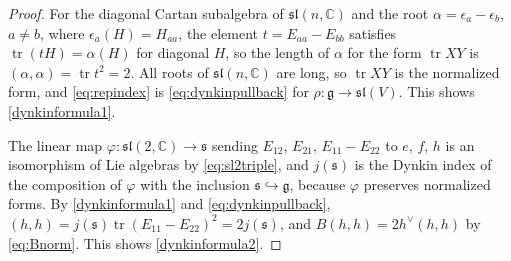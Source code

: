\documentclass [leqno, 10pt]{amsart}
\theoremstyle{definition}
\numberwithin{equation}{section}
\newcommand{\ep}{\epsilon}
\newcommand{\al}{\alpha}
\newcommand{\sll}{\mathfrak{sl}}
\newcommand{\g}{\mathfrak{g}}
\newcommand{\com}{\mathbb C}
\newcommand{\tr}{\operatorname{tr}}
\newcommand{\hv}{h^\vee}
\newcommand{\subs}{\mathfrak{s}}
\begin{document}
\begin{proof}
For the diagonal Cartan subalgebra of $\sll(n, \com)$ and the root $\al = \ep_{a} - \ep_{b}$, $a \neq b$, where $\ep_{a}(H) = H_{aa}$, the element $t = E_{aa} - E_{bb}$ satisfies $\tr(tH) = \al(H)$ for diagonal $H$, so the length of $\al$ for the form $\tr XY$ is $(\al, \al) = \tr t^{2} = 2$. All roots of $\sll(n, \com)$ are long, so $\tr XY$ is the normalized form, and \eqref{eq:repindex} is \eqref{eq:dynkinpullback} for $\rho:\g \to \sll(V)$. This shows \ref{dynkinformula1}.

The linear map $\varphi:\sll(2, \com) \to \subs$ sending $E_{12}$, $E_{21}$, $E_{11} - E_{22}$ to $e$, $f$, $h$ is an isomorphism of Lie algebras by \eqref{eq:sl2triple}, and $j(\subs)$ is the Dynkin index of the composition of $\varphi$ with the inclusion $\subs \hookrightarrow \g$, because $\varphi$ preserves normalized forms. By \ref{dynkinformula1} and \eqref{eq:dynkinpullback}, $(h, h) = j(\subs)\tr(E_{11} - E_{22})^{2} = 2j(\subs)$, and $B(h, h) = 2\hv(h, h)$ by \eqref{eq:Bnorm}. This shows \ref{dynkinformula2}.
\end{proof}
\end{document}
